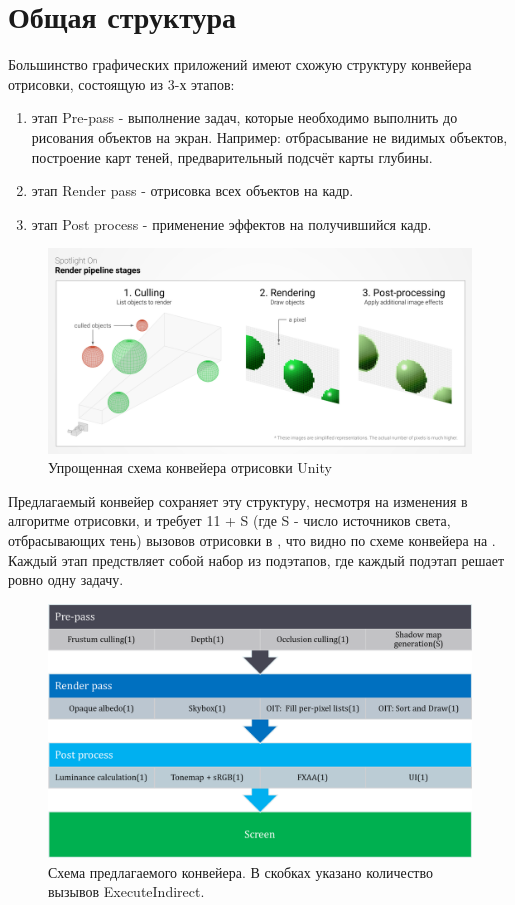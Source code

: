 \section{Общая структура} \label{ch3:pipeline_struct}
	Большинство графических приложений имеют схожую структуру конвейера отрисовки, состоящую из 3-х этапов:
	\begin{enumerate}[1.] 
		\item этап Pre-pass - выполнение задач, которые необходимо выполнить до рисования объектов на экран. Например: отбрасывание не видимых объектов, построение карт теней, предварительный подсчёт карты глубины.
		\item этап Render pass - отрисовка всех объектов на кадр.
		\item этап Post process - применение эффектов на получившийся кадр.
	\end{enumerate}
		
	\begin{figure}[ht!] 
		\center
		\includegraphics [scale=0.35] {my_folder/images//unity_pipeline}	
		\caption{Упрощенная схема конвейера отрисовки Unity} 
		\label{fig:unity_pipeline}  
	\end{figure}

	Предлагаемый конвейер сохраняет эту структуру, несмотря на изменения в алгоритме отрисовки, и требует 11 + S (где S - число источников света, отбрасывающих тень) вызовов отрисовки в , что видно по схеме конвейера на . Каждый этап предствляет собой набор из подэтапов, где каждый подэтап решает ровно одну задачу.
	
	\begin{figure}[ht!] 
		\center
		\includegraphics [scale=0.4] {my_folder/images//pipeline_schema}	
		\caption{Схема предлагаемого конвейера. В скобках указано количество вызывов ExecuteIndirect.} 
		\label{fig:pipeline_schema}  
	\end{figure}
	
	\FloatBarrier